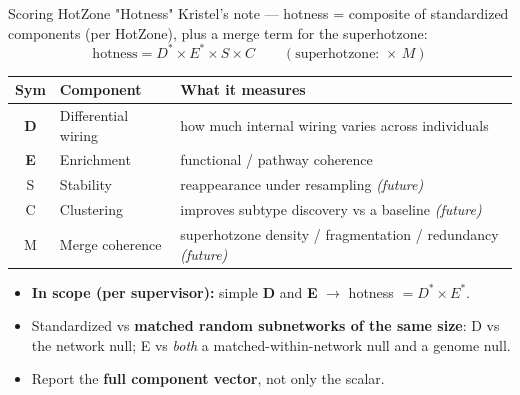 \documentclass[aspectratio=169]{beamer}
\begin{document}
\begin{frame}{Scoring HotZone "Hotness"}
    \small
    Kristel's note --- hotness = composite of standardized components (per HotZone), plus a merge term
    for the superhotzone:
    \[ \text{hotness} = D^{*}\times E^{*}\times S\times C \qquad (\text{superhotzone: }\times\,M) \]
    \centering
    \renewcommand{\arraystretch}{1.2}
    \scriptsize
    \begin{tabular}{c l p{5.6cm}}
        \toprule
        \textbf{Sym} & \textbf{Component} & \textbf{What it measures} \\
        \midrule
        \textbf{D} & Differential wiring & how much internal wiring varies across individuals \\
        \textbf{E} & Enrichment & functional / pathway coherence \\
        S & Stability & reappearance under resampling \textit{(future)} \\
        C & Clustering & improves subtype discovery vs a baseline \textit{(future)} \\
        M & Merge coherence & superhotzone density / fragmentation / redundancy \textit{(future)} \\
        \bottomrule
    \end{tabular}
    \vspace{0.2cm}
    \begin{itemize}
        \footnotesize
        \item \textbf{In scope (per supervisor):} simple \textbf{D} and \textbf{E} $\rightarrow$ hotness $=D^{*}\times E^{*}$.
        \item Standardized vs \textbf{matched random subnetworks of the same size}: D vs the network null;
              E vs \emph{both} a matched-within-network null and a genome null.
        \item Report the \textbf{full component vector}, not only the scalar.
    \end{itemize}
\end{frame}
\end{document}
